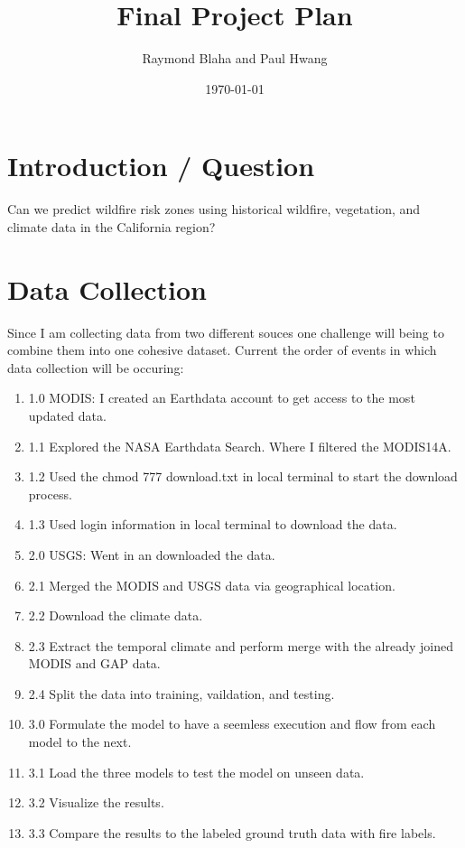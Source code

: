 \documentclass{article}
\title{Final Project Plan}
\author{Raymond Blaha and Paul Hwang}
\date{\today}
\begin{document}
\maketitle

\section{Introduction / Question}
Can we predict wildfire risk zones using historical wildfire, vegetation, and climate data in the California region?

\section{Data Collection}

Since I am collecting data from two different souces one challenge will being to combine them into one cohesive dataset. 
Current the order of events in which data collection will be occuring: 

\begin{enumerate}
    \item 1.0 MODIS: I created an Earthdata account to get access to the most updated data. 
    \item 1.1 Explored the NASA Earthdata Search. Where I filtered the MODIS14A. 
    \item 1.2 Used the chmod 777 download.txt in local terminal to start the download process.
    \item 1.3 Used login information in local terminal to download the data.
    \item 2.0 USGS: Went in an downloaded the data. 
    \item 2.1 Merged the MODIS and USGS data via geographical location.
    \item 2.2 Download the climate data.
    \item 2.3 Extract the temporal climate and perform merge with the already joined MODIS and GAP data.
    \item 2.4 Split the data into training, vaildation, and testing.
    \item 3.0 Formulate the model to have a seemless execution and flow from each model to the next. 
    \item 3.1 Load the three models to test the model on unseen data. 
    \item 3.2 Visualize the results.
    \item 3.3 Compare the results to the labeled ground truth data with fire labels. 
\end{enumerate}
\end{document}
